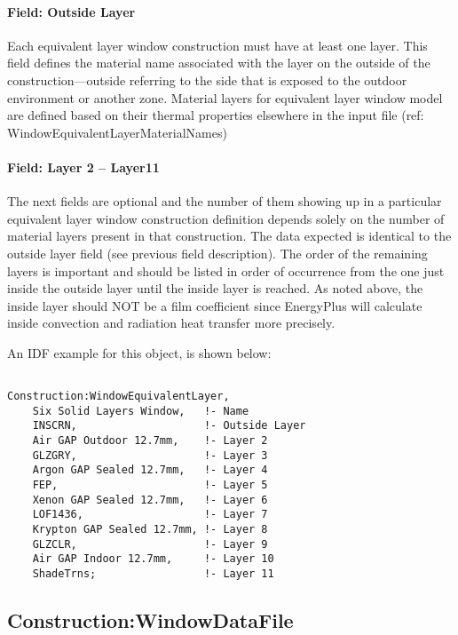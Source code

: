 \paragraph{Field: Outside Layer}\label{field-outside-layer-2}

Each equivalent layer window construction must have at least one layer. This field defines the material name associated with the layer on the outside of the construction---outside referring to the side that is exposed to the outdoor environment or another zone. Material layers for equivalent layer window model are defined based on their thermal properties elsewhere in the input file (ref: WindowEquivalentLayerMaterialNames)

\paragraph{Field: Layer 2 -- Layer11}\label{field-layer-2---layer11}

The next fields are optional and the number of them showing up in a particular equivalent layer window construction definition depends solely on the number of material layers present in that construction. The data expected is identical to the outside layer field (see previous field description). The order of the remaining layers is important and should be listed in order of occurrence from the one just inside the outside layer until the inside layer is reached. As noted above, the inside layer should NOT be a film coefficient since EnergyPlus will calculate inside convection and radiation heat transfer more precisely.

An IDF example for this object, is shown below:

\begin{lstlisting}

Construction:WindowEquivalentLayer,
    Six Solid Layers Window,   !- Name
    INSCRN,                    !- Outside Layer
    Air GAP Outdoor 12.7mm,    !- Layer 2
    GLZGRY,                    !- Layer 3
    Argon GAP Sealed 12.7mm,   !- Layer 4
    FEP,                       !- Layer 5
    Xenon GAP Sealed 12.7mm,   !- Layer 6
    LOF1436,                   !- Layer 7
    Krypton GAP Sealed 12.7mm, !- Layer 8
    GLZCLR,                    !- Layer 9
    Air GAP Indoor 12.7mm,     !- Layer 10
    ShadeTrns;                 !- Layer 11
\end{lstlisting}

\subsection{Construction:WindowDataFile}\label{constructionwindowdatafile}

